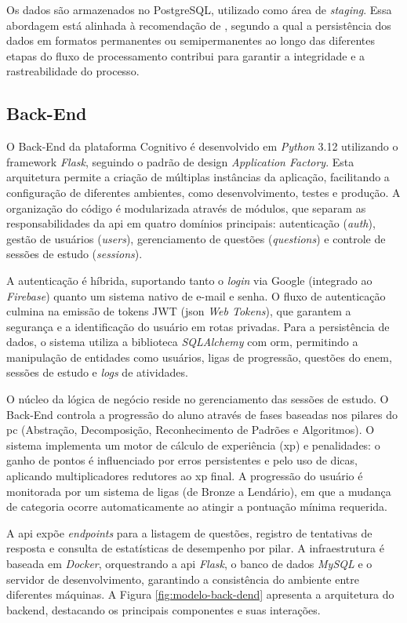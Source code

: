 Os dados são armazenados no PostgreSQL, utilizado como área de \textit{staging}. Essa abordagem está alinhada à recomendação de , segundo a qual a persistência dos dados em formatos permanentes ou semipermanentes ao longo das diferentes etapas do fluxo de processamento contribui para garantir a integridade e a rastreabilidade do processo.

\subsection{Back-End}

O Back-End da plataforma Cognitivo é desenvolvido em \textit{Python} 3.12
utilizando o framework \textit{Flask}, seguindo o padrão de design
\textit{Application Factory}. Esta arquitetura permite a criação de múltiplas
instâncias da aplicação, facilitando a configuração de diferentes ambientes,
como desenvolvimento, testes e produção. A organização do código é modularizada
através de módulos, que separam as responsabilidades da \gls{api} em quatro
domínios principais: autenticação (\textit{auth}), gestão de usuários
(\textit{users}), gerenciamento de questões (\textit{questions}) e controle de
sessões de estudo (\textit{sessions}).

A autenticação é híbrida, suportando tanto o \textit{login} via Google
(integrado ao \textit{Firebase}) quanto um sistema nativo de e-mail e senha. O
fluxo de autenticação culmina na emissão de tokens JWT (\gls{json}
\textit{Web Tokens}), que garantem a segurança e a identificação do usuário em
rotas privadas. Para a persistência de dados, o sistema utiliza a biblioteca \textit{SQLAlchemy} com \gls{orm}, permitindo a
manipulação de entidades como usuários, ligas de progressão, questões do
\gls{enem}, sessões de estudo e \textit{logs} de atividades.

O núcleo da lógica de negócio reside no gerenciamento das sessões de estudo. O
Back-End controla a progressão do aluno através de fases baseadas nos pilares do
\gls{pc} (Abstração, Decomposição, Reconhecimento de Padrões e Algoritmos). O
sistema implementa um motor de cálculo de experiência (\gls{xp}) e penalidades:
o ganho de pontos é influenciado por erros persistentes e pelo uso de dicas,
aplicando multiplicadores redutores ao \gls{xp} final. A progressão do usuário
é monitorada por um sistema de ligas (de Bronze a Lendário), em que a mudança de
categoria ocorre automaticamente ao atingir a pontuação mínima requerida.

A \gls{api} expõe \textit{endpoints} para a listagem de questões, registro de
tentativas de resposta e consulta de estatísticas de desempenho por pilar. A
infraestrutura é baseada em \textit{Docker},
orquestrando a \gls{api} \textit{Flask}, o banco de dados \textit{MySQL} e o
servidor de desenvolvimento, garantindo a consistência do ambiente
entre diferentes máquinas. A Figura \ref{fig:modelo-back-dend} apresenta a
arquitetura do backend, destacando os principais componentes e suas interações.


